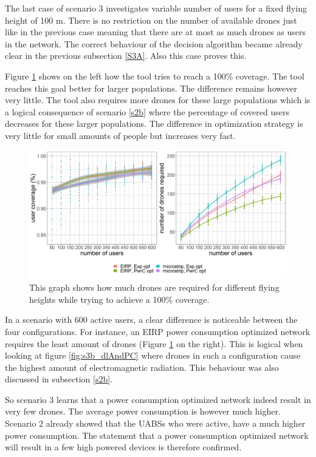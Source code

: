 The last case of scenario 3 investigates variable number of users for a fixed flying height of 100 m. There is no 
restriction on the number of available drones just like in the previous case meaning that there are at most 
as much drones as users in the network. The correct behaviour of the decision algorithm became already clear in the previous subsection \ref{S3A}. 
Also this case proves this.

Figure \ref{fig:s3b_numDronesAndCov} shows on the left how the tool tries to reach a 100\% coverage. The tool reaches this goal 
better for larger populations. The difference remains however very little. The tool also requires more drones for these large 
populations which is a logical consequence of scenario \ref{s2b} where the percentage of covered users decreases for these larger populations.
 The difference in optimization strategy is very little for small amounts of people but increases very fast. 

\begin{figure}[h!]
  \includegraphics[width=\textwidth]{../results/s3/uvsnumdronesAndCov.png}
  \caption{This graph shows how much drones are required for different flying heights while trying to achieve a 100\% coverage.}
  \label{fig:s3b_numDronesAndCov}
\end{figure}

In a scenario with 600 active users, a clear difference is noticeable between the four configurations. 
For instance, an EIRP power consumption optimized 
network requires the least amount of drones (Figure \ref{fig:s3b_numDronesAndCov} on the right). This is logical when looking at figure \ref{fig:s3b_dlAndPC} where drones in such a configuration cause the highest amount of 
electromagnetic radiation. This behaviour was also discussed in subsection \ref{s2b}. 

So scenario 3 learns that a power consumption optimized network indeed result in very few drones. The average power consumption 
is however much higher. Scenario 2 already showed that the \gls{UABS}s who were active, have a much higher power consumption.
The statement that a power consumption optimized network will result in a few high powered devices is therefore confirmed.


